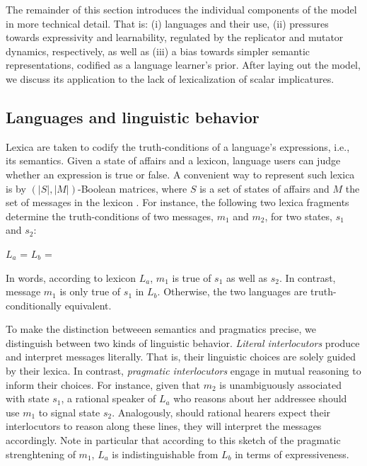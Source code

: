 \documentclass[a4paper]{article}
\begin{document}
The remainder of this section introduces the individual components of the model in more technical detail. That is: (i) languages and their use, (ii) pressures towards expressivity and learnability, regulated by the replicator and mutator dynamics, respectively, as well as (iii) a bias towards simpler semantic representations, codified as a language learner's prior. After laying out the model, we discuss its application to the lack of lexicalization of scalar implicatures.




\subsection{Languages and linguistic behavior}
Lexica are taken to codify the truth-conditions of a language's expressions, i.e., its semantics. Given a state of affairs and a lexicon, language users can judge whether an expression is true or false. A convenient way to represent such lexica is by $(|S|,|M|)$-Boolean matrices, where $S$ is a set of states of affairs and $M$ the set of messages in the lexicon \citep{franke+jaeger:2014}. For instance, the following two lexica fragments determine the truth-conditions of two messages, $m_1$ and $m_2$, for two states, $s_1$ and $s_2$:

\begin{centering}
$L_a$ =  \hspace{2cm} $L_b$ = \\[0.5cm]
\end{centering}


In words, according to lexicon $L_a$, $m_1$ is true of $s_1$ as well as $s_2$. In contrast, message $m_1$ is only true of $s_1$ in $L_b$. Otherwise, the two languages are truth-conditionally equivalent. 

To make the distinction betweeen semantics and pragmatics precise, we distinguish between two kinds of linguistic behavior. {\em Literal interlocutors} produce and interpret messages literally. That is, their linguistic choices are solely guided by their lexica. In contrast, {\em pragmatic interlocutors} engage in mutual reasoning to inform their choices. For instance, given that $m_2$ is unambiguously associated with state $s_1$, a rational speaker of $L_a$ who reasons about her addressee should use $m_1$ to signal state $s_2$. Analogously, should rational hearers expect their interlocutors to reason along these lines, they will interpret the messages accordingly. Note in particular that according to this sketch of the pragmatic strenghtening of $m_1$, $L_a$ is indistinguishable from $L_b$ in terms of expressiveness.
\end{document}
